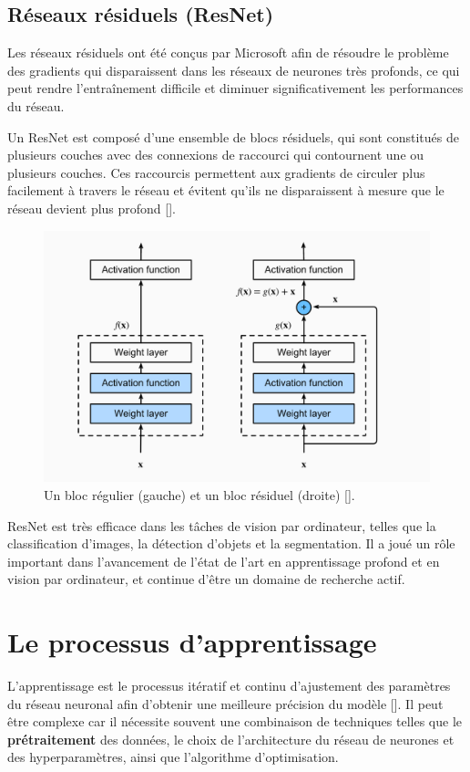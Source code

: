 \subsection{Réseaux résiduels (ResNet)}
Les réseaux résiduels ont été conçus par Microsoft afin de résoudre le problème
des gradients qui disparaissent dans les réseaux de neurones très profonds, ce
qui peut rendre l'entraînement difficile et diminuer significativement les
performances du réseau.

\medskip
Un ResNet est composé d'une ensemble de blocs résiduels, qui sont constitués de plusieurs couches avec des connexions de raccourci qui contournent une ou plusieurs couches. Ces raccourcis permettent aux gradients de circuler plus facilement à travers le réseau et évitent qu'ils ne disparaissent à mesure que le réseau devient plus profond [\cite{He_2016_CVPR}].

\begin{figure}[hbt!]
	\centering
	\includegraphics[width=12cm]{images_pfe/residual-net.png}
	\caption{Un bloc régulier (gauche) et un bloc résiduel (droite) [\cite{dong_niu_li_xie_zou_ye_wei_pan_2022}].}
	\label{fig:residual-net}
\end{figure}
\FloatBarrier

\medskip
ResNet est très efficace dans les tâches de vision par ordinateur, telles que la classification d'images, la détection d'objets et la segmentation. Il a joué un rôle important dans l'avancement de l'état de l'art en apprentissage profond et en vision par ordinateur, et continue d'être un domaine de recherche actif.

\section{Le processus d’apprentissage}
L’apprentissage est le processus itératif et continu d’ajustement des
paramètres du réseau neuronal afin d’obtenir une meilleure précision du modèle
[\cite{Goodfellow-et-al-2016}]. Il peut être complexe car il nécessite souvent
une combinaison de techniques telles que le \textbf{prétraitement} des données,
le choix de l'architecture du réseau de neurones et des hyperparamètres, ainsi
que l'algorithme d'optimisation.

